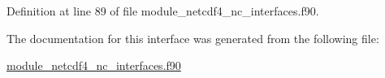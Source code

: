 Definition at line 89 of file module\+\_\+netcdf4\+\_\+nc\+\_\+interfaces.\+f90.



The documentation for this interface was generated from the following file\+:\begin{DoxyCompactItemize}
\item 
\hyperlink{module__netcdf4__nc__interfaces_8f90}{module\+\_\+netcdf4\+\_\+nc\+\_\+interfaces.\+f90}\end{DoxyCompactItemize}
